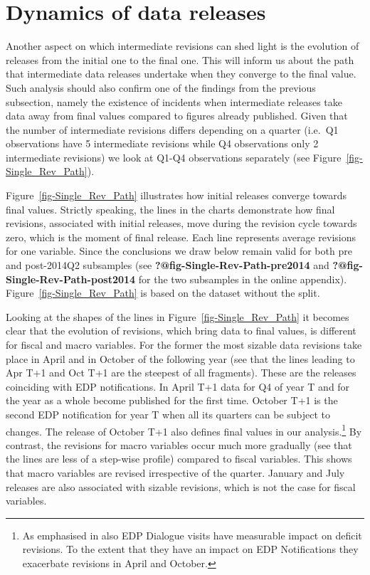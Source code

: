 \documentclass[
  letterpaper,
  authoryear,
  preprint,
  3p]{elsarticle}
\begin{document}
\hypertarget{sec-revisions_timing}{%
\section{Dynamics of data releases}\label{sec-revisions_timing}}

Another aspect on which intermediate revisions can shed light is the
evolution of releases from the initial one to the final one. This will
inform us about the path that intermediate data releases undertake when
they converge to the final value. Such analysis should also confirm one
of the findings from the previous subsection, namely the existence of
incidents when intermediate releases take data away from final values
compared to figures already published. Given that the number of
intermediate revisions differs depending on a quarter (i.e.~Q1
observations have 5 intermediate revisions while Q4 observations only 2
intermediate revisions) we look at Q1-Q4 observations separately (see
Figure~\ref{fig-Single_Rev_Path}).

Figure~\ref{fig-Single_Rev_Path} illustrates how initial releases
converge towards final values. Strictly speaking, the lines in the
charts demonstrate how final revisions, associated with initial
releases, move during the revision cycle towards zero, which is the
moment of final release. Each line represents average revisions for one
variable. Since the conclusions we draw below remain valid for both pre
and post-2014Q2 subsamples (see \textbf{?@fig-Single-Rev-Path-pre2014}
and \textbf{?@fig-Single-Rev-Path-post2014} for the two subsamples in
the online appendix). Figure~\ref{fig-Single_Rev_Path} is based on the
dataset without the split.

Looking at the shapes of the lines in Figure~\ref{fig-Single_Rev_Path}
it becomes clear that the evolution of revisions, which bring data to
final values, is different for fiscal and macro variables. For the
former the most sizable data revisions take place in April and in
October of the following year (see that the lines leading to Apr T+1 and
Oct T+1 are the steepest of all fragments). These are the releases
coinciding with EDP notifications. In April T+1 data for Q4 of year T
and for the year as a whole become published for the first time. October
T+1 is the second EDP notification for year T when all its quarters can
be subject to changes. The release of October T+1 also defines final
values in our analysis.\footnote{As emphasised in
  \citet{MaurerKeweloh2017_ecb-sps} also EDP Dialogue visits have
  measurable impact on deficit revisions. To the extent that they have
  an impact on EDP Notifications they exacerbate revisions in April and
  October.} By contrast, the revisions for macro variables occur much
more gradually (see that the lines are less of a step-wise profile)
compared to fiscal variables. This shows that macro variables are
revised irrespective of the quarter. January and July releases are also
associated with sizable revisions, which is not the case for fiscal
variables.
\end{document}

